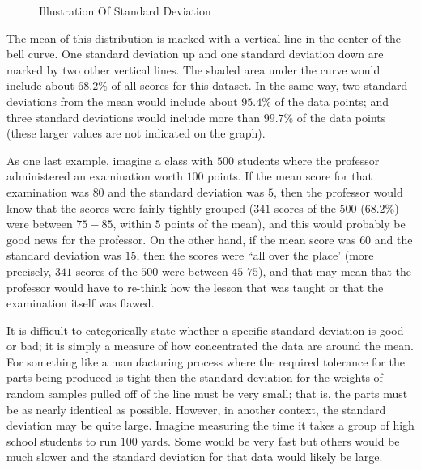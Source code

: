 \begin{figure}[H]
  \begin{center}
    \caption{Illustration Of Standard Deviation}
  \end{center}
\end{figure}

The mean of this distribution is marked with a vertical line in the center of the bell curve. One standard deviation up and one standard deviation down are marked by two other vertical lines. The shaded area under the curve would include about $ 68.2 $\% of all scores for this dataset. In the same way, two standard deviations from the mean would include about $ 95.4 $\% of the data points; and three standard deviations would include more than $ 99.7 $\% of the data points (these larger values are not indicated on the graph).

As one last example, imagine a class with $ 500 $ students where the professor administered an examination worth $ 100 $ points. If the mean score for that examination was $ 80 $ and the standard deviation was $ 5 $, then the professor would know that the scores were fairly tightly grouped ($ 341 $ scores of the $ 500 $ ($ 68.2 $\%) were between $ 75-85 $, within $ 5 $ points of the mean), and this would probably be good news for the professor. On the other hand, if the mean score was $ 60 $ and the standard deviation was $ 15 $, then the scores were ``all over the place' (more precisely, $ 341 $ scores of the $ 500 $ were between $ 45 $-$ 75 $), and that may mean that the professor would have to re-think how the lesson that was taught or that the examination itself was flawed.

It is difficult to categorically state whether a specific standard deviation is good or bad; it is simply a measure of how concentrated the data are around the mean. For something like a manufacturing process where the required tolerance for the parts being produced is tight then the standard deviation for the weights of random samples pulled off of the line must be very small; that is, the parts must be as nearly identical as possible. However, in another context, the standard deviation may be quite large. Imagine measuring the time it takes a group of high school students to run $ 100 $ yards. Some would be very fast but others would be much slower and the standard deviation for that data would likely be large. 

